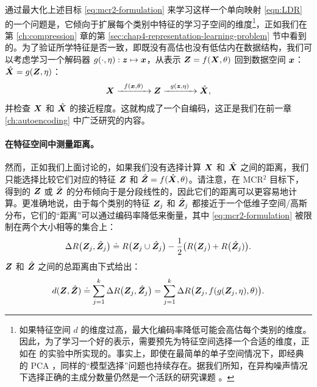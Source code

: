 \documentclass[../../book-main.tex]{subfiles}
\begin{document}
{通过最大化上述目标 \eqref{eq:mcr2-formulation} 来学习这样一个单向映射 \eqref{eqn:LDR} 的一个问题是，它倾向于扩展每个类别中特征的学习子空间的维度\footnote{如果特征空间 $d$ 的维度过高，最大化编码率降低可能会高估每个类别的维度。因此，为了学习一个好的表示，需要预先为特征空间选择一个合适的维度，正如在 \cite{yu2020learning} 的实验中所实现的。事实上，即使在最简单的单子空间情况下，即经典的 PCA \cite{Jolliffe1986}，同样的“模型选择”问题也持续存在。据我们所知，在异构噪声情况下选择正确的主成分数量仍然是一个活跃的研究课题 \cite{hong2020selecting}。}，正如我们在第 \ref{ch:compression} 章的第 \ref{sec:chap4-representation-learning-problem} 节中看到的。为了验证所学特征是否一致，即既没有高估也没有低估内在数据结构，我们可以考虑学习一个解码器 $g(\cdot,\eta): \bm{z} \mapsto  \bm{x}$，从表示 $\bm{Z} = f(\bm{X},\theta)$ 回到数据空间 $\bm{x}$：$\hat {\bm{X}} = g(\bm{Z}, \eta)$：
\begin{equation}
    \bm{X} \xrightarrow{\hspace{2mm} f(\bm{x}, \theta)\hspace{2mm}} \bm{Z} \xrightarrow{\hspace{2mm} g(\bm{z},\eta) \hspace{2mm}} \hat {\bm{X}}, 
    \label{eqn:autoencoding-ch6}
\end{equation}
并检查 $\bm{X}$ 和 $\hat {\bm{X}}$ 的接近程度。这就构成了一个自编码，这正是我们在前一章 \ref{ch:autoencoding} 中广泛研究的内容。

\paragraph{在特征空间中测量距离。}
然而，正如我们上面讨论的，如果我们没有选择计算 $\bm{X}$ 和 $\hat {\bm{X}}$ 之间的距离，我们只能选择比较它们对应的特征 $\bm{Z}$ 和 $\hat {\bm{Z}} = f(\hat {\bm{X}}, \theta)$。请注意，在 MCR$^2$ 目标下，得到的 $\bm{Z}$ 或 $\hat {\bm{Z}}$ 的分布倾向于是分段线性的，因此它们的距离可以更容易地计算。更准确地说，由于每个类别的特征 $\bm{Z}_j$ 和 $\hat{\bm{Z}}_j$ 都接近于一个低维子空间/高斯分布，它们的“距离”可以通过编码率降低来衡量，{其中 \eqref{eq:mcr2-formulation} 被限制在两个大小相等的集合上}：
\begin{equation}
\Delta R\big(\bm{Z}_j, \hat{\bm{Z}}_j\big) \doteq R\big(\bm{Z}_j \cup \hat{\bm{Z}}_j\big) - \frac{1}{2} \big( R\big(\bm{Z}_j) + R\big(\hat {\bm{Z}}_j)\big).
\end{equation}
$\bm{Z}$ 和 $\hat {\bm{Z}}$ 之间的总距离由下式给出：
\begin{equation}
d(\bm{Z}, \hat {\bm{Z}}) \doteq   \sum_{j=1}^k \Delta R\big(\bm{Z}_j, \hat{\bm{Z}}_j\big) =  \sum_{j=1}^k \Delta R\big(\bm{Z}_j, f(g(\bm{Z}_j, \eta),\theta)\big).
\label{eqn:Z-distance}
\end{equation}


}
\end{document}
